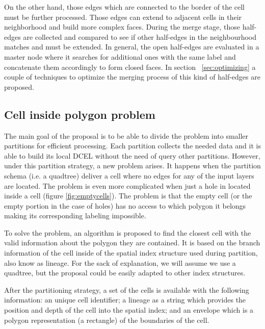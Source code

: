 On the other hand, those edges which are connected to the border of the cell must be further processed.  Those edges can extend to adjacent cells in their neighborhood and build more complex faces.  During the merge stage, those half-edges are collected and compared to see if other half-edges in the neighbourhood matches and must be extended.  In general, the open half-edges are evaluated in a master node where it searches for additional ones with the same label and concatenate them accordingly to form closed faces.  In section ~\ref{sec:optimizing} a couple of techniques to optimize the merging process of this kind of half-edges are proposed.  

\subsection{Cell inside polygon problem} \label{sec:anomalies}
The main goal of the proposal is to be able to divide the problem into smaller partitions for efficient processing.  Each partition collects the needed data and it is able to build its local DCEL without the need of query other partitions.  However, under this partition strategy, a new problem arises.  It happens when the partition schema (i.e. a quadtree) deliver a cell where no edges for any of the input layers are located.  The problem is even more complicated when just a hole in located inside a cell (figure \ref{fig:emptycells}).  The problem is that the empty cell (or the empty portion in the case of holes) has no access to which polygon it belongs making its corresponding labeling impossible.  


To solve the problem, an algorithm is proposed to find the closest cell with the valid information about the polygon they are contained.  It is based on the branch information of the cell inside of the spatial index structure used during partition, also know as lineage.  For the sack of explanation, we will assume we use a quadtree, but the proposal could be easily adapted to other index structures.

After the partitioning strategy, a set of the cells is available with the following information: an unique cell identifier; a lineage as a string which provides the position and depth of the cell into the spatial index; and an envelope which is a polygon representation (a rectangle) of the boundaries of the cell.

